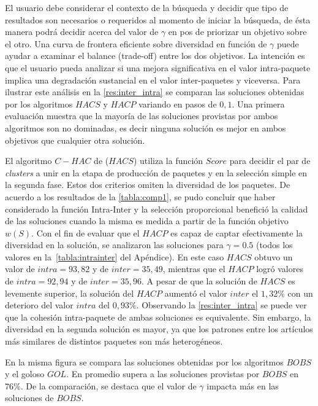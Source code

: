 El usuario debe considerar el contexto de la búsqueda y decidir que tipo de resultados son necesarios o requeridos al momento de iniciar la búsqueda, de ésta manera podrá decidir acerca del valor de $\gamma$ en pos de priorizar un objetivo sobre el otro. Una curva de frontera eficiente sobre diversidad en función de $\gamma$ puede ayudar a examinar el balance (trade-off) entre los dos objetivos. La intención es que el usuario pueda analizar si una mejora significativa en el valor intra-paquete implica una degradación sustancial en el valor inter-paquetes y viceversa. Para ilustrar este análisis en la \autoref{res:inter_intra} se comparan las soluciones obtenidas por los algoritmos $HACS$ y $HACP$ variando en pasos de $0,1$. Una primera evaluación muestra que la mayoría de las soluciones provistas por ambos algoritmos son no dominadas, es decir ninguna solución es mejor en ambos objetivos que cualquier otra solución.

El algoritmo $C-HAC$ de \cite{journals/tkde/Amer-YahiaBCFMZ14} ($HACS$) utiliza la función $Score$ para decidir el par de {\em clusters} a unir en la etapa de producción de paquetes y en la selección simple en la segunda fase. Estos dos criterios omiten la diversidad de los paquetes. De acuerdo a los resultados de la \autoref{tabla:comp1}, se pudo concluir que haber considerado la función Intra-Inter y la selección proporcional benefició la calidad de las soluciones cuando la misma es medida a partir de la función objetivo $w(S)$. Con el fin de evaluar que el $HACP$ es capaz de captar efectivamente la diversidad en la solución, se analizaron las soluciones para $\gamma=0.5$ (todos los valores en la~\autoref{tabla:intrainter} del Apéndice). En este caso $HACS$ obtuvo un valor de $intra=93,82$ y de $inter=35,49$, mientras que el $HACP$ logró valores de $intra=92,94$ y de $inter=35,96$. A pesar de que la solución de $HACS$ es levemente superior, la solución del $HACP$ aumentó el valor $inter$ el $1,32\%$ con un deterioro del valor $intra$ del $0,93\%$. Observando la \autoref{res:inter_intra} se puede ver que la cohesión intra-paquete de ambas soluciones es equivalente. Sin embargo, la diversidad en la segunda solución es mayor, ya que los patrones entre los artículos más similares de distintos paquetes son más heterogéneos. 

En la misma figura se compara las soluciones obtenidas por los algoritmos $BOBS$ y el goloso $GOL$. En promedio supera a las soluciones provistas por $BOBS$ en $76\%$. De la comparación, se destaca que el valor de $\gamma$ impacta más en las soluciones de $BOBS$.  

